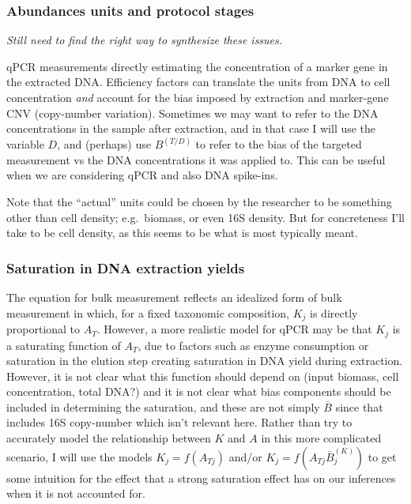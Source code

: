 \documentclass[
]{article}
\theoremstyle{definition}
\theoremstyle{definition}
\theoremstyle{definition}
\theoremstyle{definition}
\theoremstyle{remark}
\begin{document}
\hypertarget{abundances-units-and-protocol-stages}{%
\subsubsection{Abundances units and protocol stages}\label{abundances-units-and-protocol-stages}}

\emph{Still need to find the right way to synthesize these issues.}

qPCR measurements directly estimating the concentration of a marker gene in the extracted DNA.
Efficiency factors can translate the units from DNA to cell concentration \emph{and} account for the bias imposed by extraction and marker-gene CNV (copy-number variation).
Sometimes we may want to refer to the DNA concentrations in the sample after extraction, and in that case I will use the variable \(D\), and (perhaps) use \(B^{(T/D)}\) to refer to the bias of the targeted measurement vs the DNA concentrations it was applied to.
This can be useful when we are considering qPCR and also DNA spike-ins.

Note that the ``actual'' units could be chosen by the researcher to be something other than cell density; e.g.~biomass, or even 16S density.
But for concreteness I'll take to be cell density, as this seems to be what is most typically meant.

\hypertarget{saturation-in-dna-extraction-yields}{%
\subsubsection{Saturation in DNA extraction yields}\label{saturation-in-dna-extraction-yields}}

The equation for bulk measurement reflects an idealized form of bulk measurement in which, for a fixed taxonomic composition, \(K_j\) is directly proportional to \(A_T\).
However, a more realistic model for qPCR may be that \(K_j\) is a saturating function of \(A_T\), due to factors such as enzyme consumption or saturation in the elution step creating saturation in DNA yield during extraction.
However, it is not clear what this function should depend on (input biomass, cell concentration, total DNA?) and it is not clear what bias components should be included in determining the saturation, and these are not simply \(\bar B\) since that includes 16S copy-number which isn't relevant here.
Rather than try to accurately model the relationship between \(K\) and \(A\) in this more complicated scenario, I will use the models \(K_j = f(A_{Tj})\) and/or \(K_j = f(A_{Tj}\bar B^{(K)}_j)\) to get some intuition for the effect that a strong saturation effect has on our inferences when it is not accounted for.
\end{document}
